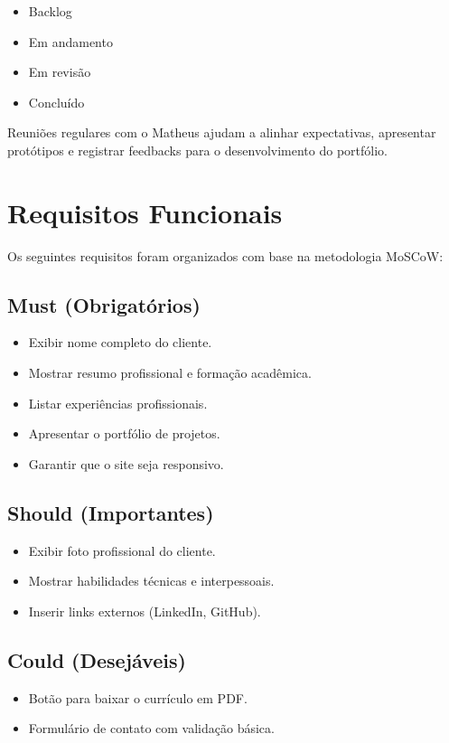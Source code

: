 \documentclass[a4paper,12pt]{article}
\begin{document}
\begin{itemize}
  \item Backlog
  \item Em andamento
  \item Em revisão
  \item Concluído
\end{itemize}

Reuniões regulares com o Matheus ajudam a alinhar expectativas, apresentar protótipos e registrar feedbacks para o desenvolvimento do portfólio.

\section{Requisitos Funcionais}
Os seguintes requisitos foram organizados com base na metodologia MoSCoW:

\subsection*{Must (Obrigatórios)}
\begin{itemize}
  \item Exibir nome completo do cliente.
  \item Mostrar resumo profissional e formação acadêmica.
  \item Listar experiências profissionais.
  \item Apresentar o portfólio de projetos.
  \item Garantir que o site seja responsivo.
\end{itemize}

\subsection*{Should (Importantes)}
\begin{itemize}
  \item Exibir foto profissional do cliente.
  \item Mostrar habilidades técnicas e interpessoais.
  \item Inserir links externos (LinkedIn, GitHub).
\end{itemize}

\subsection*{Could (Desejáveis)}
\begin{itemize}
  \item Botão para baixar o currículo em PDF.
  \item Formulário de contato com validação básica.
\end{itemize}
\end{document}
